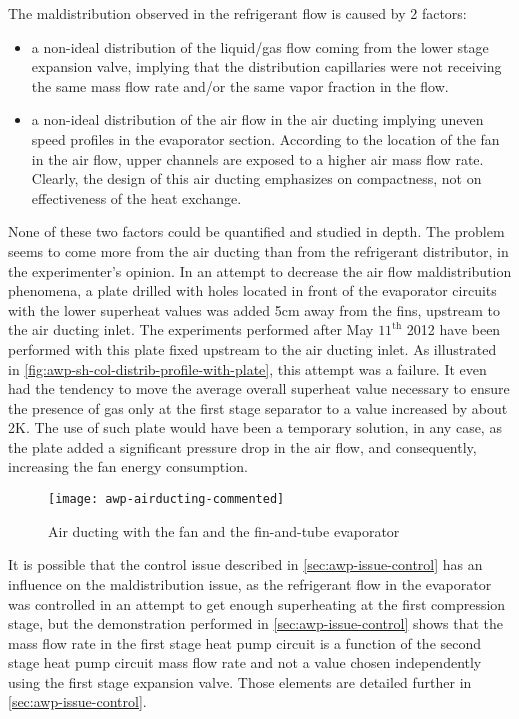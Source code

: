 The maldistribution observed in the refrigerant flow is caused by 2
factors:

\begin{itemize}
\item a non-ideal distribution of the liquid/gas flow coming from the
  lower stage expansion valve, implying that the distribution
  capillaries were not receiving the same mass flow rate and/or the
  same vapor fraction in the flow.
\item a non-ideal distribution of the air flow in the air ducting
  implying uneven speed profiles in the evaporator section. According
  to the location of the fan in the air flow, upper channels are
  exposed to a higher air mass flow rate. Clearly, the design of this
  air ducting emphasizes on compactness, not on effectiveness of the
  heat exchange.
\end{itemize}

None of these two factors could be quantified and studied in
depth. The problem seems to come more from the air ducting than from
the refrigerant distributor, in the experimenter's opinion. In an
attempt to decrease the air flow maldistribution phenomena, a plate
drilled with holes located in front of the evaporator circuits with
the lower superheat values was added 5cm away from the fins, upstream
to the air ducting inlet. The experiments performed after May
$11^{\text{th}}$ 2012 have been performed with this plate fixed
upstream to the air ducting inlet. As illustrated in
\cref{fig:awp-sh-col-distrib-profile-with-plate}, this attempt was a
failure. It even had the tendency to move the average overall
superheat value necessary to ensure the presence of gas only at the
first stage separator to a value increased by about
2\si{\kelvin}. The use of such plate would have been a
temporary solution, in any case, as the plate added a significant
pressure drop in the air flow, and consequently, increasing the
fan energy consumption.

\begin{figure}[htbp]
  \centering
  \texttt{[image: awp-airducting-commented]}
  \caption{Air ducting with the fan and the fin-and-tube evaporator}
  \label{fig:awp-air-channel}
\end{figure}

It is possible that the control issue described in
\cref{sec:awp-issue-control} has an influence on the maldistribution
issue, as the refrigerant flow in the evaporator was controlled in an
attempt to get enough superheating at the first compression stage, but
the demonstration performed in \cref{sec:awp-issue-control} shows that
the mass flow rate in the first stage heat pump circuit is a function
of the second stage heat pump circuit mass flow rate and not a value
chosen independently using the first stage expansion valve. Those
elements are detailed further in \cref{sec:awp-issue-control}.

